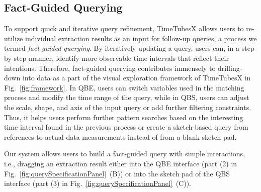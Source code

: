 \subsection{Fact-Guided Querying}\label{sec:factDrivenQuerying}
To support quick and iterative query refinement, TimeTubesX allows users to re-utilize individual extraction results as an input for follow-up queries, a process we termed \emph{fact-guided querying}.
By iteratively updating a query, users can, in a step-by-step manner, identify more observable time intervals that reflect their intentions.
Therefore, fact-guided querying contributes immensely to drilling-down into data as a part of the visual exploration framework of TimeTubesX in Fig.~\ref{fig:framework}.
In QBE, users can switch variables used in the matching process and modify the time range of the query, while in QBS, users can adjust the scale, shape, and axis of the input query or add further filtering constraints.
Thus, it helps users perform further pattern searches based on the interesting time interval found in the previous process or create a sketch-based query from references to actual data measurements instead of from a blank sketch pad.

Our system allows users to build a fact-guided query with simple interactions, i.e.,
dragging an extraction result either into the QBE interface (part (2) in Fig.~\ref{fig:querySpecificationPanel}~(B)) or into the sketch pad of the QBS interface (part (3) in Fig.~\ref{fig:querySpecificationPanel}~(C)).
%


